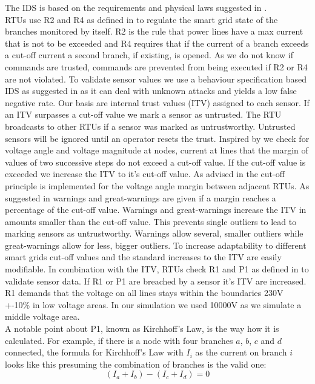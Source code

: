 \documentclass[conference]{IEEEtran}
\begin{document}
		The IDS is based on the requirements and physical laws suggested in \cite{chromik1}. \\
		RTUs use R2 and R4 as defined in \cite{chromik1} to regulate the smart grid state of the branches monitored by itself. R2 is the rule that power lines have a max current that is not to be exceeded and R4 requires that if the current of a branch exceeds a cut-off current a second branch, if existing, is opened. As we do not know if commands are trusted, commands are prevented from being executed if R2 or R4 are not violated. To validate sensor values we use a behaviour specification based IDS as suggested in \cite{chromik2} as it can deal with unknown attacks and yields a low false negative rate. Our basis are internal trust values (ITV) assigned to each sensor. If an ITV surpasses a cut-off value we mark a sensor as untrusted. The RTU broadcasts to other RTUs if a sensor was marked as untrustworthy. Untrusted sensors will be ignored until an operator resets the trust. Inspired by \cite{blithe} we check for voltage angle and voltage magnitude at nodes, current at lines that the margin of values of two successive steps do not exceed a cut-off value. If the cut-off value is exceeded we increase the ITV to it's cut-off value. As advised in \cite{blithe} the cut-off principle is implemented for the voltage angle margin between adjacent RTUs. As suggested in \cite{blithe} warnings and great-warnings are given if a margin reaches a percentage of the cut-off value. Warnings and great-warnings increase the ITV in amounts smaller than the cut-off value. This prevents single outliers to lead to marking sensors as untrustworthy. Warnings allow several, smaller outliers while great-warnings allow for less, bigger outliers. To increase adaptability to different smart grids cut-off values and the standard increases to the ITV are easily modifiable. In combination with the ITV, RTUs check R1 and P1 as defined in \cite{chromik1} to validate sensor data. If R1 or P1 are breached by a sensor it's ITV are increased. R1 demands that the voltage on all lines stays within the boundaries 230V +-10\% in low voltage areas. In our simulation we used 10000V as we simulate a middle voltage area. \\
		A notable point about P1, known as Kirchhoff's Law, is the way how it is calculated.
		For example, if there is a node with four branches $a$, $b$, $c$ and $d$ connected, the formula for Kirchhoff's Law with $I_i$ as the current on branch $i$ looks like this presuming the combination of branches is the valid one:
		\begin{equation}
			(I_a + I_b) - (I_c + I_d) = 0
			\label{eq:klaw}
		\end{equation}
\end{document}
